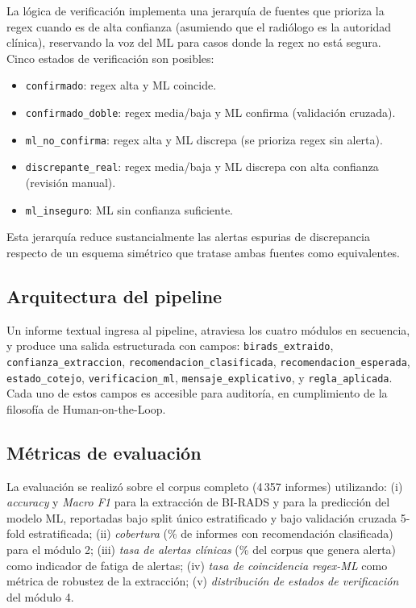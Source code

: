 \documentclass[10pt,journal,a4paper]{IEEEtran}
\begin{document}
La l\'ogica de verificaci\'on implementa una jerarqu\'ia de fuentes que prioriza la regex cuando es de alta confianza (asumiendo que el radi\'ologo es la autoridad cl\'inica), reservando la voz del ML para casos donde la regex no est\'a segura. Cinco estados de verificaci\'on son posibles:
\begin{itemize}
    \item \texttt{confirmado}: regex alta y ML coincide.
    \item \texttt{confirmado\_doble}: regex media/baja y ML confirma (validaci\'on cruzada).
    \item \texttt{ml\_no\_confirma}: regex alta y ML discrepa (se prioriza regex sin alerta).
    \item \texttt{discrepante\_real}: regex media/baja y ML discrepa con alta confianza (revisi\'on manual).
    \item \texttt{ml\_inseguro}: ML sin confianza suficiente.
\end{itemize}
Esta jerarqu\'ia reduce sustancialmente las alertas espurias de discrepancia respecto de un esquema sim\'etrico que tratase ambas fuentes como equivalentes.

\subsection{Arquitectura del pipeline}
Un informe textual ingresa al pipeline, atraviesa los cuatro m\'odulos en secuencia, y produce una salida estructurada con campos: \texttt{birads\_extraido}, \texttt{confianza\_extraccion}, \texttt{recomendacion\_clasificada}, \texttt{recomendacion\_esperada}, \texttt{estado\_cotejo}, \texttt{verificacion\_ml}, \texttt{mensaje\_explicativo}, y \texttt{regla\_aplicada}. Cada uno de estos campos es accesible para auditor\'ia, en cumplimiento de la filosof\'ia de Human-on-the-Loop.

\subsection{M\'etricas de evaluaci\'on}
La evaluaci\'on se realiz\'o sobre el corpus completo (4\,357 informes) utilizando: (i) \emph{accuracy} y \emph{Macro F1} para la extracci\'on de BI-RADS y para la predicci\'on del modelo ML, reportadas bajo split \'unico estratificado y bajo validaci\'on cruzada 5-fold estratificada; (ii) \emph{cobertura} (\% de informes con recomendaci\'on clasificada) para el m\'odulo 2; (iii) \emph{tasa de alertas cl\'inicas} (\% del corpus que genera alerta) como indicador de fatiga de alertas; (iv) \emph{tasa de coincidencia regex-ML} como m\'etrica de robustez de la extracci\'on; (v) \emph{distribuci\'on de estados de verificaci\'on} del m\'odulo 4.
\end{document}
